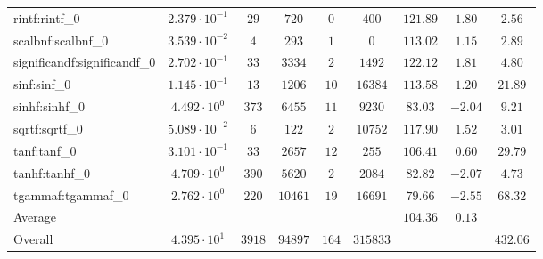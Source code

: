\begin{tabular}{|l|c|c|c|c|c|c|c|c|}
rintf:rintf\_0               & $ 2.379 \cdot 10^{-1} $ & $ 29     $ & $ 720   $ & $ 0   $ & $ 400    $ & $ 121.89      $ & $ 1.80    $ & $ 2.56    $ \\
scalbnf:scalbnf\_0           & $ 3.539 \cdot 10^{-2} $ & $ 4      $ & $ 293   $ & $ 1   $ & $ 0      $ & $ 113.02      $ & $ 1.15    $ & $ 2.89    $ \\
significandf:significandf\_0 & $ 2.702 \cdot 10^{-1} $ & $ 33     $ & $ 3334  $ & $ 2   $ & $ 1492   $ & $ 122.12      $ & $ 1.81    $ & $ 4.80    $ \\
sinf:sinf\_0                 & $ 1.145 \cdot 10^{-1} $ & $ 13     $ & $ 1206  $ & $ 10  $ & $ 16384  $ & $ 113.58      $ & $ 1.20    $ & $ 21.89   $ \\
sinhf:sinhf\_0               & $ 4.492 \cdot 10^{0}  $ & $ 373    $ & $ 6455  $ & $ 11  $ & $ 9230   $ & $ 83.03       $ & $ -2.04   $ & $ 9.21    $ \\
sqrtf:sqrtf\_0               & $ 5.089 \cdot 10^{-2} $ & $ 6      $ & $ 122   $ & $ 2   $ & $ 10752  $ & $ 117.90      $ & $ 1.52    $ & $ 3.01    $ \\
tanf:tanf\_0                 & $ 3.101 \cdot 10^{-1} $ & $ 33     $ & $ 2657  $ & $ 12  $ & $ 255    $ & $ 106.41      $ & $ 0.60    $ & $ 29.79   $ \\
tanhf:tanhf\_0               & $ 4.709 \cdot 10^{0}  $ & $ 390    $ & $ 5620  $ & $ 2   $ & $ 2084   $ & $ 82.82       $ & $ -2.07   $ & $ 4.73    $ \\
tgammaf:tgammaf\_0           & $ 2.762 \cdot 10^{0}  $ & $ 220    $ & $ 10461 $ & $ 19  $ & $ 16691  $ & $ 79.66       $ & $ -2.55   $ & $ 68.32   $ \\
\hline
Average                      & $                     $ & $        $ & $       $ & $     $ & $        $ & $ 104.36      $ & $ 0.13    $ & $         $ \\
\hline
Overall                      & $ 4.395 \cdot 10^{1}  $ & $ 3918   $ & $ 94897 $ & $ 164 $ & $ 315833 $ & $             $ & $         $ & $ 432.06  $ \\
\hline
\end{tabular}
